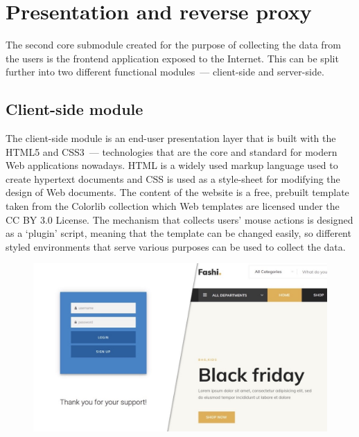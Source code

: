 \section{Presentation and reverse proxy}\label{sec:reverse-proxy}
The second core submodule created for the purpose of collecting the data from the users is the frontend application exposed to the Internet.
This can be split further into two different functional modules~--- client-side and server-side.

\subsection{Client-side module}\label{subsec:client-side-module}
The client-side module is an end-user presentation layer that is built with the HTML5 and CSS3~--- technologies that are the core and standard for modern Web applications nowadays.
HTML is a widely used markup language used to create hypertext documents and CSS is used as a style-sheet for modifying the design of Web documents.
The content of the website is a free, prebuilt template taken from the Colorlib collection which Web templates are licensed under the CC BY 3.0 License.
The mechanism that collects users' mouse actions is designed as a `plugin' script, meaning that the template can be changed easily, so different styled environments that serve various purposes can be used to collect the data.

\begin{figure}[hbt!]
    \centering
    \includegraphics[width=0.7\linewidth]{resources/frontpage.jpeg}
    \label{fig:frontpage}
\end{figure}

